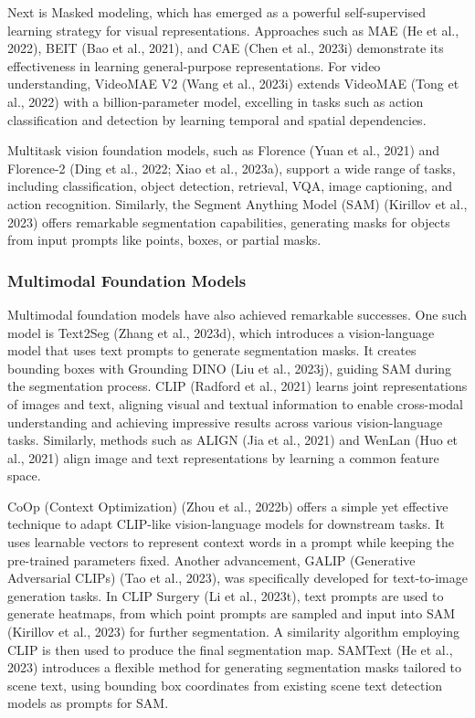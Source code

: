 Next is Masked modeling, which has emerged as a powerful self-supervised learning strategy for visual representations. Approaches such as MAE (He et al., 2022), BEIT (Bao et al., 2021), and CAE (Chen et al., 2023i) demonstrate its effectiveness in learning general-purpose representations. For video understanding, VideoMAE V2 (Wang et al., 2023i) extends VideoMAE (Tong et al., 2022) with a billion-parameter model, excelling in tasks such as action classification and detection by learning temporal and spatial dependencies.

Multitask vision foundation models, such as Florence (Yuan et al., 2021) and Florence-2 (Ding et al., 2022; Xiao et al., 2023a), support a wide range of tasks, including classification, object detection, retrieval, VQA, image captioning, and action recognition. Similarly, the Segment Anything Model (SAM) (Kirillov et al., 2023) offers remarkable segmentation capabilities, generating masks for objects from input prompts like points, boxes, or partial masks.

\subsubsection{Multimodal Foundation Models}

Multimodal foundation models have also achieved remarkable successes. One such model is Text2Seg (Zhang et al., 2023d), which introduces a vision-language model that uses text prompts to generate segmentation masks. It creates bounding boxes with Grounding DINO (Liu et al., 2023j), guiding SAM during the segmentation process. CLIP (Radford et al., 2021) learns joint representations of images and text, aligning visual and textual information to enable cross-modal understanding and achieving impressive results across various vision-language tasks. Similarly, methods such as ALIGN (Jia et al., 2021) and WenLan (Huo et al., 2021) align image and text representations by learning a common feature space.

CoOp (Context Optimization) (Zhou et al., 2022b) offers a simple yet effective technique to adapt CLIP-like vision-language models for downstream tasks. It uses learnable vectors to represent context words in a prompt while keeping the pre-trained parameters fixed. Another advancement, GALIP (Generative Adversarial CLIPs) (Tao et al., 2023), was specifically developed for text-to-image generation tasks. In CLIP Surgery (Li et al., 2023t), text prompts are used to generate heatmaps, from which point prompts are sampled and input into SAM (Kirillov et al., 2023) for further segmentation. A similarity algorithm employing CLIP is then used to produce the final segmentation map. SAMText (He et al., 2023) introduces a flexible method for generating segmentation masks tailored to scene text, using bounding box coordinates from existing scene text detection models as prompts for SAM.

